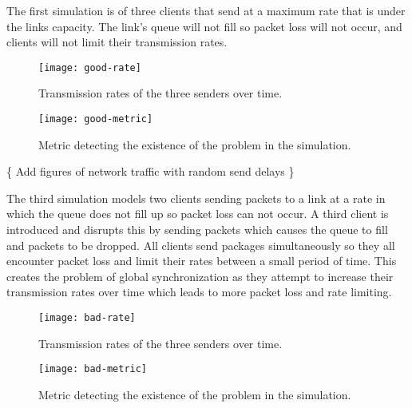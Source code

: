\documentclass{article}
\begin{document}
	The first simulation is of three clients that send at a maximum rate that is under the links capacity. The link's queue will not fill so packet loss will not occur, and clients will not limit their transmission rates.\newline
	\begin{figure}[H]
		\centering
		\texttt{[image: good-rate]}
		\caption{Transmission rates of the three senders over time.}
	\end{figure}

	\begin{figure}[H]
		\centering
		\texttt{[image: good-metric]}
		\caption{Metric detecting the existence of the problem in the simulation.}
	\end{figure}
	
																			\{ Add figures of network traffic with random send delays \}\newline
																			
	The third simulation models two clients sending packets to a link at a rate in which the queue does not fill up so packet loss can not occur. A third client is introduced and disrupts this by sending packets which causes the queue to fill and packets to be dropped. All clients send packages simultaneously so they all encounter packet loss and limit their rates between a small period of time. This creates the problem of global synchronization as they attempt to increase their transmission rates over time which leads to more packet loss and rate limiting.\newline
	\begin{figure}[H]
		\centering
		\texttt{[image: bad-rate]}
		\caption{Transmission rates of the three senders over time.}
	\end{figure}

	\begin{figure}[H]
		\centering
		\texttt{[image: bad-metric]}
		\caption{Metric detecting the existence of the problem in the simulation.}
	\end{figure}



\end{document}
